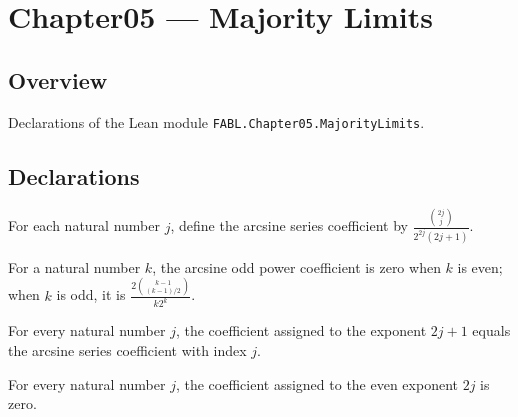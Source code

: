 \chapter{Chapter05 — Majority Limits}
\section{Overview}

Declarations of the Lean module \texttt{FABL.Chapter05.MajorityLimits}.

\section{Declarations}

\begin{definition}
\label{FABL.arcsinSeriesCoefficient}
\leanok
For each natural number $j$, define the arcsine series coefficient by $\displaystyle
\frac{\binom{2j}{j}}{2^{2j}(2j+1)}$.
\end{definition}

\begin{definition}
\label{FABL.arcsinOddPowerCoefficient}
\leanok
For a natural number $k$, the arcsine odd power coefficient is zero when $k$ is even;
when $k$ is odd, it is $\displaystyle \frac{2\binom{k-1}{(k-1)/2}}{k2^k}$.
\end{definition}

\begin{theorem}
\label{FABL.arcsinOddPowerCoefficient_two_mul_add_one}
\leanok
{}
For every natural number $j$, the coefficient assigned to the exponent $2j+1$ equals the
arcsine series coefficient with index $j$.
\end{theorem}

\begin{lemma}
\label{FABL.arcsinOddPowerCoefficient_two_mul}
\leanok
{}
For every natural number $j$, the coefficient assigned to the even exponent $2j$ is
zero.
\end{lemma}

